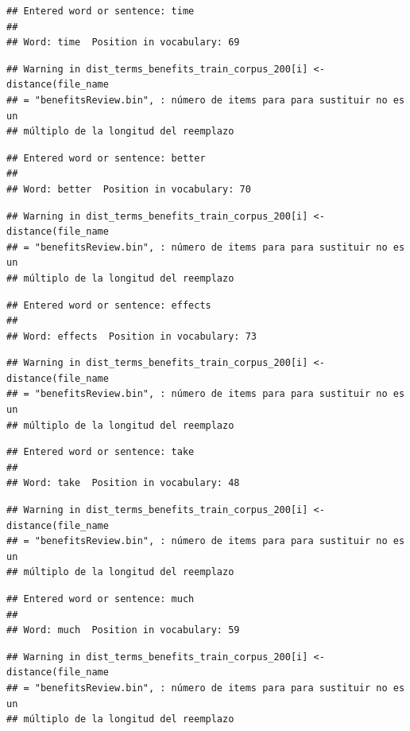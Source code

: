 \documentclass[spanish,]{article}
\begin{document}
\begin{verbatim}
## Entered word or sentence: time
## 
## Word: time  Position in vocabulary: 69
\end{verbatim}

\begin{verbatim}
## Warning in dist_terms_benefits_train_corpus_200[i] <- distance(file_name
## = "benefitsReview.bin", : número de items para para sustituir no es un
## múltiplo de la longitud del reemplazo
\end{verbatim}

\begin{verbatim}
## Entered word or sentence: better
## 
## Word: better  Position in vocabulary: 70
\end{verbatim}

\begin{verbatim}
## Warning in dist_terms_benefits_train_corpus_200[i] <- distance(file_name
## = "benefitsReview.bin", : número de items para para sustituir no es un
## múltiplo de la longitud del reemplazo
\end{verbatim}

\begin{verbatim}
## Entered word or sentence: effects
## 
## Word: effects  Position in vocabulary: 73
\end{verbatim}

\begin{verbatim}
## Warning in dist_terms_benefits_train_corpus_200[i] <- distance(file_name
## = "benefitsReview.bin", : número de items para para sustituir no es un
## múltiplo de la longitud del reemplazo
\end{verbatim}

\begin{verbatim}
## Entered word or sentence: take
## 
## Word: take  Position in vocabulary: 48
\end{verbatim}

\begin{verbatim}
## Warning in dist_terms_benefits_train_corpus_200[i] <- distance(file_name
## = "benefitsReview.bin", : número de items para para sustituir no es un
## múltiplo de la longitud del reemplazo
\end{verbatim}

\begin{verbatim}
## Entered word or sentence: much
## 
## Word: much  Position in vocabulary: 59
\end{verbatim}

\begin{verbatim}
## Warning in dist_terms_benefits_train_corpus_200[i] <- distance(file_name
## = "benefitsReview.bin", : número de items para para sustituir no es un
## múltiplo de la longitud del reemplazo
\end{verbatim}
\end{document}
